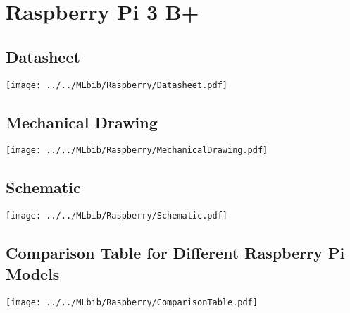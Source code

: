 %
%
%

\chapter{Raspberry Pi 3 B+}

\section{Datasheet}

\setcounter{mycounterRaspPi}{1}

{
	\texttt{[image: ../../MLbib/Raspberry/Datasheet.pdf]}
	\newpage
}





\section{Mechanical Drawing}


\texttt{[image: ../../MLbib/Raspberry/MechanicalDrawing.pdf]}

\section{Schematic}

\texttt{[image: ../../MLbib/Raspberry/Schematic.pdf]}

\newpage





\section{Comparison Table for Different Raspberry Pi Models}


\texttt{[image: ../../MLbib/Raspberry/ComparisonTable.pdf]}




